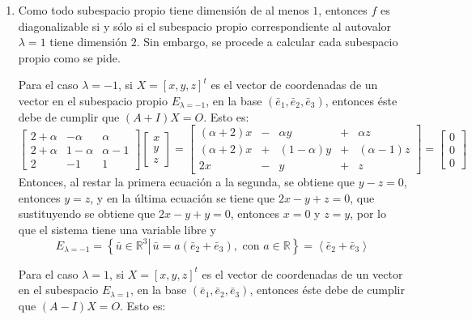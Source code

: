 \begin{solucion}
\begin{enumerate}[$a$)]
  \item Como todo subespacio propio tiene dimensi\'on de al menos $1$, entonces $f$ es diagonalizable si y s\'olo si el subespacio propio correspondiente al autovalor $\lambda = 1$ tiene dimensi\'on $2$. Sin embargo, se procede a calcular cada subespacio propio como se pide.
  \par 
  Para el caso $\lambda = -1$, si $X = [x,y,z]^t$ es el vector de coordenadas de un vector en el subespacio propio $E_{\lambda=-1}$, en la base $(\bar{e}_1, \bar{e}_2, \bar{e}_3)$, entonces \'este debe de cumplir que $(A + I)X = O$. Esto es:
  \begin{equation*}
   \begin{bmatrix}
    2+\alpha&  -\alpha & \alpha  \\
    2+\alpha& 1-\alpha & \alpha-1\\
    2       &  -1      & 1
   \end{bmatrix}
   \begin{bmatrix}
    x \\ y \\ z
   \end{bmatrix}
   = 
   \begin{bmatrix}
    (\alpha+2)x & - & \alpha y & + & \alpha z \\
    (\alpha+2)x & + & (1-\alpha)y&+ & (\alpha-1)z \\
    2x & - & y & + & z
   \end{bmatrix}
   =
   \begin{bmatrix}
    0 \\ 0 \\ 0
   \end{bmatrix}
  \end{equation*}
  Entonces, al restar la primera ecuaci\'on a la segunda, se obtiene que $y - z = 0$, entonces $y = z$, y en la \'ultima ecuaci\'on se tiene que $2x - y + z = 0$, que sustituyendo se obtiene que $2x -y+y= 0$, entonces $x=0$ y $z = y$, por lo que el sistema tiene una variable libre y
  \begin{equation*}
   E_{\lambda=-1} = \left\{ \left. \bar{u} \in \mathbb{R}^3 \right| \, \bar{u} = a(\bar{e}_2 + \bar{e}_3), \text{ con } a\in\mathbb{R} \right\} = \left< \bar{e}_2 + \bar{e}_3 \right>
  \end{equation*}
  \par 
  Para el caso $\lambda = 1$, si $X = [x,y,z]^t$ es el vector de coordenadas de un vector en el subespacio $E_{\lambda = 1}$, en la base $(\bar{e}_1, \bar{e}_2, \bar{e}_3)$, entonces \'este debe de cumplir que $(A-I)X = O$. Esto es:

\end{enumerate}
\end{solucion}
